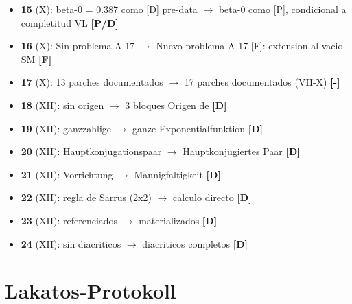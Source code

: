 ﻿\documentclass[11pt,letterpaper]{article}
\begin{document}
\begin{itemize}[leftmargin=*]
\item \textbf{15} (X): beta-0 = 0.387 como [D] pre-data $\rightarrow$ beta-0 como [P], condicional a completitud VL \textcolor{Ppurple}{\textbf{[P/D]}}
\item \textbf{16} (X): Sin problema A-17 $\rightarrow$ Nuevo problema A-17 [F]: extension al vacio SM \textcolor{Forange}{\textbf{[F]}}
\item \textbf{17} (X): 13 parches documentados $\rightarrow$ 17 parches documentados (VII-X) \textcolor{black}{\textbf{[-]}}
\item \textbf{18} (XII): sin origen $\rightarrow$ 3 bloques Origen de \textcolor{Dgreen}{\textbf{[D]}}
\item \textbf{19} (XII): ganzzahlige $\rightarrow$ ganze Exponentialfunktion \textcolor{Dgreen}{\textbf{[D]}}
\item \textbf{20} (XII): Hauptkonjugationspaar $\rightarrow$ Hauptkonjugiertes Paar \textcolor{Dgreen}{\textbf{[D]}}
\item \textbf{21} (XII): Vorrichtung $\rightarrow$ Mannigfaltigkeit \textcolor{Dgreen}{\textbf{[D]}}
\item \textbf{22} (XII): regla de Sarrus (2x2) $\rightarrow$ calculo directo \textcolor{Dgreen}{\textbf{[D]}}
\item \textbf{23} (XII): referenciados $\rightarrow$ materializados \textcolor{Dgreen}{\textbf{[D]}}
\item \textbf{24} (XII): sin diacriticos $\rightarrow$ diacriticos completos \textcolor{Dgreen}{\textbf{[D]}}
\end{itemize}

\newpage
\section*{Lakatos-Protokoll}
\end{document}
